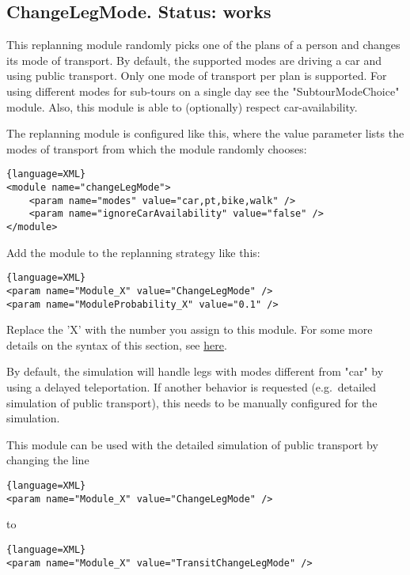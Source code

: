 \subsection{ChangeLegMode. Status: works}
\label{sec:changeLegMode}


This replanning module randomly picks one of the plans of a person  and changes its mode of transport. By default, the supported modes  are driving a car and using public transport. Only one mode of transport  per plan is supported. For using different modes for sub-tours on a  single day see the "SubtourModeChoice" module. Also, this module is able  to (optionally) respect car-availability.

The replanning module is configured like this, where the value  parameter lists the modes of transport from which the module randomly  chooses:
\begin{lstlisting}{language=XML}
<module name="changeLegMode">
    <param name="modes" value="car,pt,bike,walk" />
    <param name="ignoreCarAvailability" value="false" />
</module>
\end{lstlisting}

Add the module to the replanning strategy like this:
\begin{lstlisting}{language=XML}
<param name="Module_X" value="ChangeLegMode" />
<param name="ModuleProbability_X" value="0.1" />
\end{lstlisting}

Replace the 'X' with the number you assign to this module. For some more details on the syntax of this section, see \href{http://matsim.org/node/478}{here}.

By default, the simulation will handle legs with modes different from  "car" by using a delayed teleportation. If another behavior is  requested (e.g.\ detailed simulation of public transport), this needs to  be manually configured for the simulation.

This module can be used with the detailed simulation of public transport by changing the line

\begin{lstlisting}{language=XML}
<param name="Module_X" value="ChangeLegMode" />
\end{lstlisting}

to

\begin{lstlisting}{language=XML}
<param name="Module_X" value="TransitChangeLegMode" />
\end{lstlisting}

